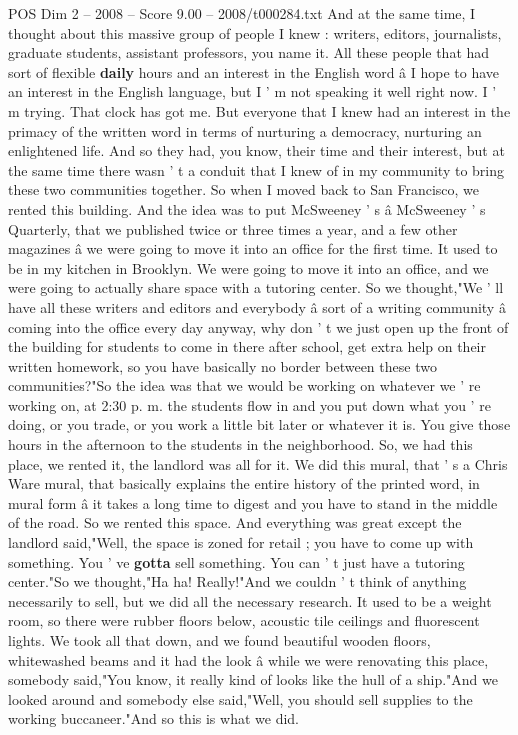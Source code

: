 \begin{textsample}{POS Dim 2 – 2008 – Score 9.00 – 2008/t000284.txt}
And at the same time, I thought about this massive group of people I knew : writers, editors, journalists, graduate students, assistant professors, you name it.
All these people that had sort of flexible \textbf{daily} hours and an interest in the English word â I hope to have an interest in the English language, but I ' m not speaking it well right now.
I ' m trying.
That clock has got me.
But everyone that I knew had an interest in the primacy of the written word in terms of nurturing a democracy, nurturing an enlightened life.
And so they had, you know, their time and their interest, but at the same time there wasn ' t a conduit that I knew of in my community to bring these two communities together.
So when I moved back to San Francisco, we rented this building.
And the idea was to put McSweeney ' s â McSweeney ' s Quarterly, that we published twice or three times a year, and a few other magazines â we were going to move it into an office for the first time.
It used to be in my kitchen in Brooklyn.
We were going to move it into an office, and we were going to actually share space with a tutoring center.
So we thought,"We ' ll have all these writers and editors and everybody â sort of a writing community â coming into the office every day anyway, why don ' t we just open up the front of the building for students to come in there after school, get extra help on their written homework, so you have basically no border between these two communities?"So the idea was that we would be working on whatever we ' re working on, at 2:30 p. m. the students flow in and you put down what you ' re doing, or you trade, or you work a little bit later or whatever it is.
You give those hours in the afternoon to the students in the neighborhood.
So, we had this place, we rented it, the landlord was all for it.
We did this mural, that ' s a Chris Ware mural, that basically explains the entire history of the printed word, in mural form â it takes a long time to digest and you have to stand in the middle of the road.
So we rented this space.
And everything was great except the landlord said,"Well, the space is zoned for retail ; you have to come up with something.
You ' ve \textbf{gotta} sell something.
You can ' t just have a tutoring center."So we thought,"Ha ha!
Really!"And we couldn ' t think of anything necessarily to sell, but we did all the necessary research.
It used to be a weight room, so there were rubber floors below, acoustic tile ceilings and fluorescent lights.
We took all that down, and we found beautiful wooden floors, whitewashed beams and it had the look â while we were renovating this place, somebody said,"You know, it really kind of looks like the hull of a ship."And we looked around and somebody else said,"Well, you should sell supplies to the working buccaneer."And so this is what we did.

\end{textsample}

